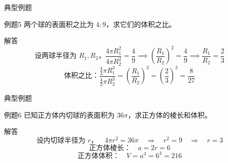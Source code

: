   
  \begin{frame}{典型例题}
    \begin{exampleblock}{例题5}
        两个球的表面积之比为 \(4:9\)，求它们的体积之比。
    \end{exampleblock}
    
    \pause
    
    \begin{alertblock}{解答}
        \[
        \text{设两球半径为 } R_1, R_2，\frac{4\pi R_1^2}{4\pi R_2^2} = \frac{4}{9} \implies \left(\frac{R_1}{R_2}\right)^2 = \frac{4}{9} \implies \frac{R_1}{R_2} = \frac{2}{3}
        \]
        \[
        \text{体积之比：} \frac{\frac{4}{3}\pi R_1^3}{\frac{4}{3}\pi R_2^3} = \left(\frac{R_1}{R_2}\right)^3 = \left(\frac{2}{3}\right)^3 = \frac{8}{27}
        \]
    \end{alertblock}
  \end{frame}
  
  
  
  
  \begin{frame}{典型例题}
    \begin{exampleblock}{例题6}
        已知正方体内切球的表面积为 \(36\pi\)，求正方体的棱长和体积。
    \end{exampleblock}
    
    \pause
    
    \begin{alertblock}{解答}
        \[
        \text{设内切球半径为 } r，\quad 4\pi r^2 = 36\pi \quad \Rightarrow \quad r^2 = 9 \quad \Rightarrow \quad r = 3
        \]
        \[
        \text{正方体棱长：} \quad a = 2r = 6
        \]
        \[
        \text{正方体体积：} \quad V = a^3 = 6^3 = 216
        \]
    \end{alertblock}
  \end{frame}
  
  